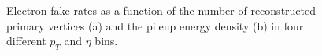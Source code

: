 \begin{figure}[!htbp]
\begin{center}
\caption{Electron fake rates as a function of the number of reconstructed primary vertices (a) 
and the pileup energy density (b) in four different $p_{T}$ and $\eta$ bins.}
\label{fig:ele_fr_PileupDependence}
\end{center}
\end{figure}


